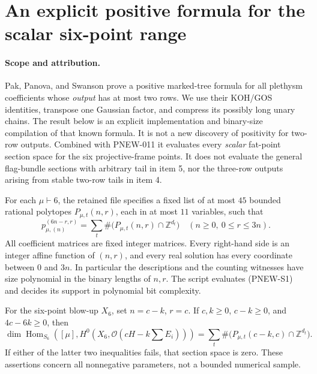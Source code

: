 \section{An explicit positive formula for the scalar six-point range}
\label{sec:outer-six-scalar-positive}

\paragraph{Scope and attribution.}
Pak, Panova, and Swanson prove a positive marked-tree formula for
all plethysm coefficients whose \emph{output} has at most two rows.
We use their KOH/GOS identities, transpose one Gaussian factor,
and compress its possibly long unary chains.  The result below
is an explicit implementation and binary-size compilation of
that known formula.  It is not a new discovery of positivity
for two-row outputs.  Combined with PNEW-011 it evaluates every
\emph{scalar} fat-point section space for the six projective-frame
points.  It does not evaluate the general flag-bundle sections
with arbitrary tail in item 5, nor the three-row outputs arising
from stable two-row tails in item 4.

\begin{theorem}
For each $\mu\vdash6$, the retained file
 specifies a
fixed list of at most $45$ bounded rational polytopes
$P_{\mu,t}(n,r)$, each in at most $11$ variables, such that
\[
 p_{\mu,(n)}^{(6n-r,r)}
       =\sum_t\#\bigl(P_{\mu,t}(n,r)\cap\mathbb Z^{d_t}\bigr)
 \quad(n\ge0,\ 0\le r\le3n).
 \tag{PNEW-S1}
\]
All coefficient matrices are fixed integer matrices.  Every
right-hand side is an integer affine function of $(n,r)$,
and every real solution has every coordinate between $0$ and
$3n$.  In particular the descriptions and the counting witnesses
have size polynomial in the binary lengths of $n,r$.
The script  evaluates (PNEW-S1)
and decides its support in polynomial bit complexity.

For the six-point blow-up $X_6$, set $n=c-k$, $r=c$.
If $c,k\ge0$, $c-k\ge0$, and $4c-6k\ge0$, then
\[
 \dim\operatorname{Hom}_{S_6}\!\left(
 [\mu],H^0(X_6,\mathcal O(cH-k\sum E_i))\right)
     =\sum_t\#\bigl(P_{\mu,t}(c-k,c)\cap\mathbb Z^{d_t}\bigr).
 \tag{PNEW-S2}
\]
If either of the latter two inequalities fails, that section
space is zero.  These assertions concern all nonnegative
parameters, not a bounded numerical sample.
\end{theorem}

